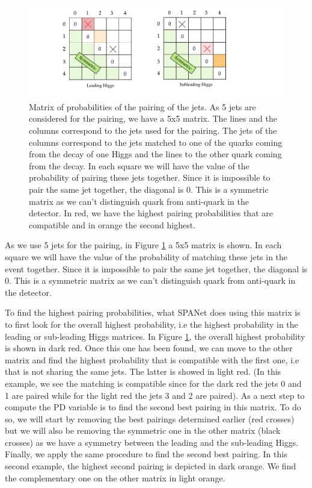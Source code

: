 \begin{figure}[hbt]
    \centering
    \includegraphics[width=0.8\linewidth]{Images/7.S:B/Prob diff/probability difference.pdf}
    \caption{Matrix of probabilities of the pairing of the jets. As 5 jets are considered for the pairing, we have a 5x5 matrix. The lines and the columns correspond to the jets used for the pairing. The jets of the columns correspond to the jets matched to one of the quarks coming from the decay of one Higgs and the lines to the other quark coming from the decay. In each square we will have the value of the probability of pairing these jets together. Since it is impossible to pair the same jet together, the diagonal is 0. This is a symmetric matrix as we can't distinguish quark from anti-quark in the detector. In red, we have the highest pairing probabilities that are compatible and in orange the second highest.}
    \label{fig: probabilities matrix}
\end{figure}

As we use 5 jets for the pairing, in Figure \ref{fig: probabilities matrix} a 5x5 matrix is shown. In each square we will have the value of the probability of matching these jets in the event together. Since it is impossible to pair the same jet together, the diagonal is 0. This is a symmetric matrix as we can't distinguish quark from anti-quark in the detector. 

To find the highest pairing probabilities, what SPANet does using this matrix is to first look for the overall highest probability, i.e the highest probability in the leading or sub-leading Higgs matrices. In Figure \ref{fig: probabilities matrix}, the overall highest probability is shown in dark red. Once this one has been found, we can move to the other matrix and find the highest probability that is compatible with the first one, i.e that is not sharing the same jets. The latter is showed in light red. (In this example, we see the matching is compatible since for the dark red the jets 0 and 1 are paired while for the light red the jets 3 and 2 are paired). As a next step to compute the PD variable is to find the second best pairing in this matrix. To do so, we will start by removing the best pairings determined earlier (red crosses) but we will also be removing the symmetric one in the other matrix (black crosses) as we have a symmetry between the leading and the sub-leading Higgs. Finally, we apply the same procedure to find the second best pairing. In this second example, the highest second pairing is depicted in dark orange. We find the complementary one on the other matrix in light orange.

